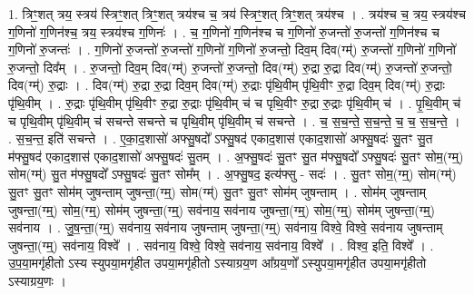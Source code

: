\documentclass[17pt]{extarticle}
\begin{document}
1. त्रिꣳ॒॒शत् त्रय॒ स्त्रय॑ स्त्रिꣳ॒॒शत् त्रिꣳ॒॒शत् त्रय॑श्च च॒ त्रय॑ स्त्रिꣳ॒॒शत् त्रिꣳ॒॒शत् त्रय॑श्च । . त्रय॑श्च च॒ त्रय॒ स्त्रय॑श्च ग॒णिनो॑ ग॒णिन॑श्च॒ त्रय॒ स्त्रय॑श्च ग॒णिनः॑ । . च॒ ग॒णिनो॑ ग॒णिन॑श्च च ग॒णिनो॑ रु॒जन्तो॑ रु॒जन्तो॑ ग॒णिन॑श्च च ग॒णिनो॑ रु॒जन्तः॑ । . ग॒णिनो॑ रु॒जन्तो॑ रु॒जन्तो॑ ग॒णिनो॑ ग॒णिनो॑ रु॒जन्तो॒ दिव॒म् दिव(ग्म्॑) रु॒जन्तो॑ ग॒णिनो॑ ग॒णिनो॑ रु॒जन्तो॒ दिव᳚म् । . रु॒जन्तो॒ दिव॒म् दिव(ग्म्॑) रु॒जन्तो॑ रु॒जन्तो॒ दिव(ग्म्॑) रु॒द्रा रु॒द्रा दिव(ग्म्॑) रु॒जन्तो॑ रु॒जन्तो॒ दिव(ग्म्॑) रु॒द्राः । . दिव(ग्म्॑) रु॒द्रा रु॒द्रा दिव॒म् दिव(ग्म्॑) रु॒द्राः पृ॑थि॒वीम् पृ॑थि॒वीꣳ रु॒द्रा दिव॒म् दिव(ग्म्॑) रु॒द्राः पृ॑थि॒वीम् । . रु॒द्राः पृ॑थि॒वीम् पृ॑थि॒वीꣳ रु॒द्रा रु॒द्राः पृ॑थि॒वीम् च॑ च पृथि॒वीꣳ रु॒द्रा रु॒द्राः पृ॑थि॒वीम् च॑ । . पृ॒थि॒वीम् च॑ च पृथि॒वीम् पृ॑थि॒वीम् च॑ सचन्ते सचन्ते च पृथि॒वीम् पृ॑थि॒वीम् च॑ सचन्ते । . च॒ स॒च॒न्ते॒ स॒च॒न्ते॒ च॒ च॒ स॒च॒न्ते॒ । . स॒च॒न्त॒ इति॑ सचन्ते । . ए॒का॒द॒शासो॑ अफ्सु॒षदो᳚ ऽफ्सु॒षद॑ एकाद॒शास॑ एकाद॒शासो॑ अफ्सु॒षदः॑ सु॒तꣳ सु॒त म॑फ्सु॒षद॑ एकाद॒शास॑ एकाद॒शासो॑ अफ्सु॒षदः॑ सु॒तम् । . अ॒फ्सु॒षदः॑ सु॒तꣳ सु॒त म॑फ्सु॒षदो᳚ ऽफ्सु॒षदः॑ सु॒तꣳ सोम॒(ग्म्॒) सोम(ग्म्॑) सु॒त म॑फ्सु॒षदो᳚ ऽफ्सु॒षदः॑ सु॒तꣳ सोम᳚म् । . अ॒फ्सु॒षद॒ इत्य॑फ्सु - सदः॑ । . सु॒तꣳ सोम॒(ग्म्॒) सोम(ग्म्॑) सु॒तꣳ सु॒तꣳ सोम॑म् जुषन्ताम् जुषन्ता॒(ग्म्॒) सोम(ग्म्॑) सु॒तꣳ सु॒तꣳ सोम॑म् जुषन्ताम् । . सोम॑म् जुषन्ताम् जुषन्ता॒(ग्म्॒) सोम॒(ग्म्॒) सोम॑म् जुषन्ता॒(ग्म्॒) सव॑नाय॒ सव॑नाय जुषन्ता॒(ग्म्॒) सोम॒(ग्म्॒) सोम॑म् जुषन्ता॒(ग्म्॒) सव॑नाय । . जु॒ष॒न्ता॒(ग्म्॒) सव॑नाय॒ सव॑नाय जुषन्ताम् जुषन्ता॒(ग्म्॒) सव॑नाय॒ विश्वे॒ विश्वे॒ सव॑नाय जुषन्ताम् जुषन्ता॒(ग्म्॒) सव॑नाय॒ विश्वे᳚ । . सव॑नाय॒ विश्वे॒ विश्वे॒ सव॑नाय॒ सव॑नाय॒ विश्वे᳚ । . विश्व॒ इति॒ विश्वे᳚ । . उ॒प॒या॒मगृ॑हीतो ऽस्य स्युपया॒मगृ॑हीत उपया॒मगृ॑हीतो ऽस्याग्रय॒ण आ᳚ग्रय॒णो᳚ ऽस्युपया॒मगृ॑हीत उपया॒मगृ॑हीतो ऽस्याग्रय॒णः । \newline
\end{document}
